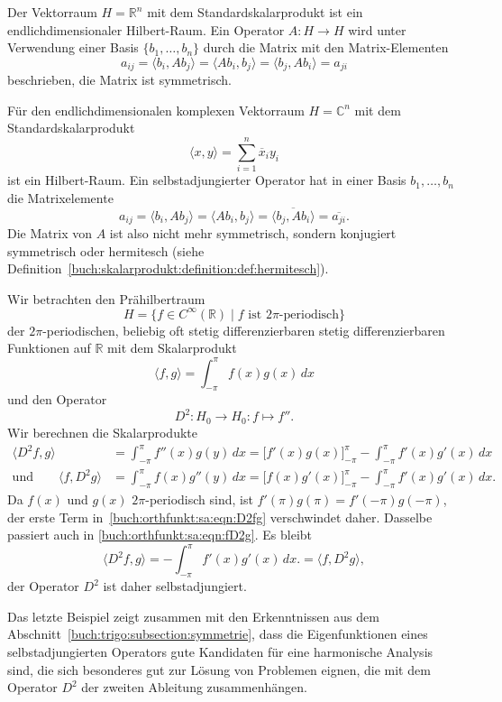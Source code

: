 \begin{beispiel}
Der Vektorraum $H=\mathbb{R}^n$ mit dem Standardskalarprodukt ist ein
endlichdimensionaler Hilbert-Raum.
Ein Operator $A\colon H\to H$ wird unter Verwendung einer Basis
$\{b_1,\dots,b_n\}$ durch die Matrix mit den Matrix-Elementen
\[
a_{i\!j}
=
\langle b_i,Ab_j\rangle
=
\langle Ab_i,b_j\rangle
=
\langle b_j,Ab_i\rangle
=
a_{ji}
\]
beschrieben, die Matrix ist symmetrisch.
\end{beispiel}

\begin{beispiel}
Für den endlichdimensionalen komplexen Vektorraum $H=\mathbb{C}^n$ mit dem
Standardskalarprodukt
\[
\langle x,y\rangle
=
\sum_{i=1}^n  \overline{x}_i y_i
\]
ist ein Hilbert-Raum.
Ein selbstadjungierter Operator hat in einer Basis $b_1,\dots,b_n$
die Matrixelemente
\[
a_{i\!j}
=
\langle b_i,Ab_j\rangle
=
\langle Ab_i,b_j\rangle
=
\overline{
\langle b_j,Ab_i\rangle
}
=
\overline{a_{ji}}.
\]
Die Matrix von $A$ ist also nicht mehr symmetrisch, sondern konjugiert
symmetrisch oder hermitesch (siehe
Definition~\ref{buch:skalarprodukt:definition:def:hermitesch}).
\end{beispiel}

\begin{beispiel}
\label{buch:orthfkt:sa:beispiel:D2}
Wir betrachten den Prähilbertraum
\[
H
=
\{f\in C^{\infty}(\mathbb{R})
\mid
\text{$f$ ist $2\pi$-periodisch}
\}
\]
der $2\pi$-periodischen, beliebig oft stetig differenzierbaren
stetig differenzierbaren Funktionen auf $\mathbb{R}$ mit dem
Skalarprodukt
\[
\langle f,g\rangle
=
\int_{-\pi}^\pi
f(x)g(x)\,dx
\]
und den Operator
\[
D^2
\colon
H_0 \to H_0
:
f\mapsto f''.
\]
Wir berechnen die Skalarprodukte
\begin{align}
\langle D^2f,g\rangle
&=
\int_{-\pi}^\pi f''(x)g(y)\,dx
=
\biggl[f'(x)g(x)\biggr]_{-\pi}^\pi
-
\int_{-\pi}^\pi f'(x)g'(x)\,dx
\label{buch:orthfunkt:sa:eqn:D2fg}
\\
\text{und}\qquad
\langle f,D^2g\rangle
&=
\int_{-\pi}^\pi f(x)g''(y)\,dx
=
\biggl[f(x)g'(x)\biggr]_{-\pi}^\pi
-
\int_{-\pi}^\pi f'(x)g'(x)\,dx.
\label{buch:orthfunkt:sa:eqn:fD2g}
\end{align}
Da $f(x)$ und $g(x)$ $2\pi$-periodisch sind, ist
$f'(\pi)g(\pi)=f'(-\pi)g(-\pi)$, der erste Term
in~\eqref{buch:orthfunkt:sa:eqn:D2fg} verschwindet daher.
Dasselbe passiert auch in \eqref{buch:orthfunkt:sa:eqn:fD2g}.
Es bleibt
\[
\langle D^2f,g\rangle
=
-
\int_{-\pi}^\pi f'(x)g'(x)\,dx.
=
\langle f,D^2g\rangle,
\]
der Operator $D^2$ ist daher selbstadjungiert.
\end{beispiel}

Das letzte Beispiel zeigt zusammen mit den Erkenntnissen aus dem
Abschnitt~\ref{buch:trigo:subsection:symmetrie}, dass die
Eigenfunktionen eines selbstadjungierten Operators gute Kandidaten
für eine harmonische Analysis sind, die sich besonderes gut
zur Lösung von Problemen eignen, die mit dem Operator $D^2$ der
zweiten Ableitung zusammenhängen.





